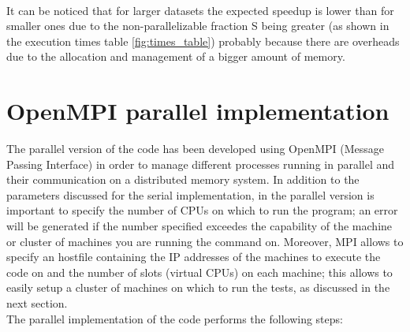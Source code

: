 \documentclass[final,5p,times,twocolumn,authoryear]{elsarticle}
\begin{document}
\\It can be noticed that for larger datasets the expected speedup is lower than for smaller ones due to the non-parallelizable fraction S being greater (as shown in the execution times table \ref{fig:times_table}) probably because there are overheads due to the allocation and management of a bigger amount of memory.

\section{OpenMPI parallel implementation}
The parallel version of the code has been developed using OpenMPI (Message Passing Interface) in order to manage different processes running in parallel and their communication on a distributed memory system. In addition to the parameters discussed for the serial implementation, in the parallel version is important to specify the number of CPUs on which to run the program; an error will be generated if the number specified exceedes the capability of the machine or cluster of machines you are running the command on. Moreover, MPI allows to specify an hostfile containing the IP addresses of the machines to execute the code on and the number of slots (virtual CPUs) on each machine; this allows to easily setup a cluster of machines on which to run the tests, as discussed in the next section. \\
The parallel implementation of the code performs the following steps:
\end{document}
